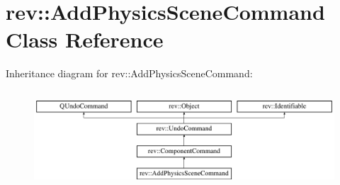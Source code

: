 \hypertarget{classrev_1_1_add_physics_scene_command}{}\section{rev\+::Add\+Physics\+Scene\+Command Class Reference}
\label{classrev_1_1_add_physics_scene_command}
Inheritance diagram for rev\+::Add\+Physics\+Scene\+Command\+:\begin{figure}[H]
\begin{center}
\leavevmode
\includegraphics[height=3.678161cm]{classrev_1_1_add_physics_scene_command}
\end{center}
\end{figure}

